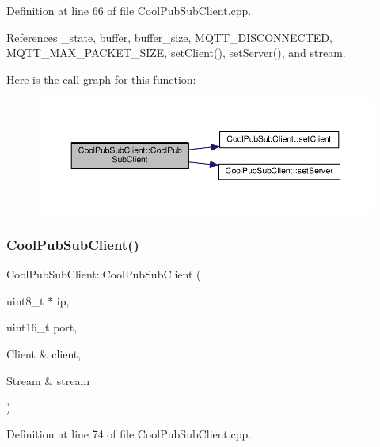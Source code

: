 Definition at line 66 of file Cool\+Pub\+Sub\+Client.\+cpp.



References \+\_\+state, buffer, buffer\+\_\+size, M\+Q\+T\+T\+\_\+\+D\+I\+S\+C\+O\+N\+N\+E\+C\+T\+ED, M\+Q\+T\+T\+\_\+\+M\+A\+X\+\_\+\+P\+A\+C\+K\+E\+T\+\_\+\+S\+I\+ZE, set\+Client(), set\+Server(), and stream.

Here is the call graph for this function\+:\nopagebreak
\begin{figure}[H]
\begin{center}
\leavevmode
\includegraphics[width=350pt]{d8/d4b/class_cool_pub_sub_client_a15e4dd41ebda943c377539086f70469d_cgraph}
\end{center}
\end{figure}
\mbox{\label{class_cool_pub_sub_client_a3e7d7fa4b55e36f0ac8912335993d650}} 
\subsubsection{\texorpdfstring{Cool\+Pub\+Sub\+Client()}{CoolPubSubClient()}\hspace{0.1cm}{\footnotesize\ttfamily [8/14]}}
{\footnotesize\ttfamily Cool\+Pub\+Sub\+Client\+::\+Cool\+Pub\+Sub\+Client (\begin{DoxyParamCaption}\item[{uint8\+\_\+t $\ast$}]{ip,  }\item[{uint16\+\_\+t}]{port,  }\item[{Client \&}]{client,  }\item[{Stream \&}]{stream }\end{DoxyParamCaption})}



Definition at line 74 of file Cool\+Pub\+Sub\+Client.\+cpp.



